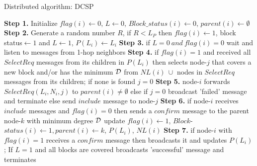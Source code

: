 \documentclass{acm_proc_article-sp}
\begin{document}
 \begin{algorithm}[!h]
  \scriptsize
  \SetLine
\caption{\scriptsize{ Distributed algorithm: DCSP}}
{
    {\bf Step 1.} Initialize $flag(i) \leftarrow 0$, $L \leftarrow 0$, $Block\_status(i)\leftarrow 0$, $parent(i) \leftarrow \emptyset$\;
    {\bf Step 2.} Generate a random number $R$, if $R<L_P$ then $flag(i)\leftarrow 1$, block status$\leftarrow 1$ and $L\leftarrow 1$, $P(L_i)\leftarrow L_i$\; 
    {\bf Step 3.} if $L=0\ and\ flag(i) = 0$ wait and listen to messages from 1-hop neighbors\;
    {\bf Step 4.} if $flag(i)=1$ and received all $SelectReq$ messages from its children in $P(L_i)$ then selects node-$j$ that covers a new block and/or has the minimum ${\cal D}$ from $NL(i)~\cup$ nodes in $SelectReq$ messages from its children; if none is found $j=0$\;
    {\bf Step 5.} node-$i$ forwards $SelectReq(L_i, N_i, j)$ to $parent(i)\neq \emptyset$ else if $j=0$ broadcast 'failed' message and terminate else send $include$ message to node-$j$ \;
    {\bf Step 6.} if node-$i$ receives $include$ messages and $flag(i) = 0$ then sends a $confirm$ message to the parent node-$k$ with minimum degree ${\cal D}$\; update $flag(i)\leftarrow 1$, $Block$-$status(i)\leftarrow 1, parent(i)\leftarrow k$, $P(L_i)$, $NL(i)$\;
    {\bf Step 7.} if node-$i$ with $flag(i)=1$ receives a $confirm$ message then broadcasts it and updates $P(L_i)$; If $L=1$ and all blocks are covered broadcasts 'successful' message and terminates \;
 }
 \normalsize
 \end{algorithm}
\vspace{-0.5cm}
\end{document}
